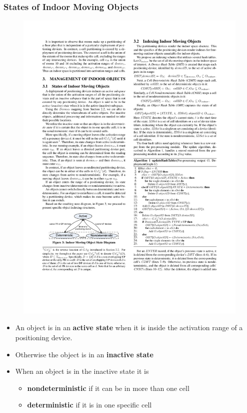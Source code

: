 \begin{frame}
\frametitle{States of Indoor Moving Objects}


  \begin{figure}[tb]
    \includegraphics[width=0.6\columnwidth]{figures/2-2/2-2-3.pdf}
  \end{figure}
  \vspace{-10pt}
  \begin{itemize}
    \item An object is in an \textbf{active state} when it is inside the activation range of a positioning device.
    \item Otherwise the object is in an \textbf{inactive state}
    \item When an object is in the inactive state it is
      \begin{itemize}
        \item \textbf{nondeterministic} if it can be in more than one cell
        \item \textbf{deterministic} if it is in one specific cell
      \end{itemize}
  \end{itemize}


\end{frame}


